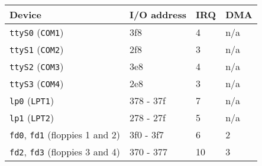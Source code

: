 {\newpage
\clearpage
\samepage \begin{table}[ht]\begin{center}
\small\begin{tabular}{llll}
\hline
Device                     &   I/O address  & IRQ & DMA \\ 
\hline
{\tt ttyS0} ({\tt COM1})   &   3f8	    &  4  &  n/a \\ 
{\tt ttyS1} ({\tt COM2})   &   2f8	    &  3  &  n/a \\ 
{\tt ttyS2} ({\tt COM3})   &   3e8	    &  4  &  n/a \\ 
{\tt ttyS3} ({\tt COM4})   &   2e8	    &  3  &  n/a \\ 

{\tt lp0} ({\tt LPT1})	   &   378 - 37f    &  7  &  n/a \\ 
{\tt lp1} ({\tt LPT2})	   &   278 - 27f    &  5  &  n/a \\ 

{\tt fd0}, {\tt fd1} (floppies 1 and 2) & 3f0 - 3f7 & 6 & 2 \\ 
{\tt fd2}, {\tt fd3} (floppies 3 and 4) & 370 - 377 & 10 & 3 

\end{tabular}\normalsize\rm

\label{table-dev-settings}
\end{center}\end{table}
}

{\newpage
\clearpage
\samepage {}
}

{\newpage
\clearpage
\samepage {}
}

{\newpage
\clearpage
\samepage {}
}

{\newpage
\clearpage
\samepage {}
}

{\newpage
\clearpage
\samepage {}
}

{\newpage
\clearpage
\samepage {}
}

{\newpage
\clearpage
\samepage {}
}

{\newpage
\clearpage
\samepage {}
}

{\newpage
\clearpage
\samepage {}
}

{\newpage
\clearpage
\samepage {}
}

{\newpage
\clearpage
\samepage {}
}

